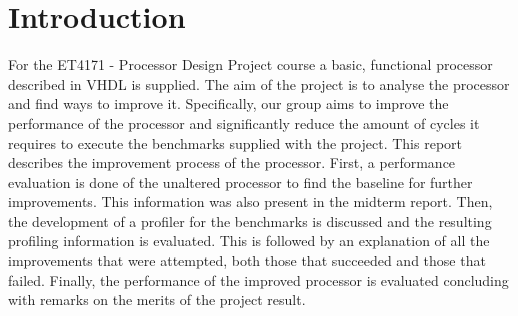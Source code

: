 \documentclass[final]{article}
\begin{document}
\section{Introduction}
For the ET4171 - Processor Design Project course a basic, functional processor described in VHDL is supplied.
The aim of the project is to analyse the processor and find ways to improve it.
Specifically, our group aims to improve the performance of the processor and significantly reduce the amount of cycles it requires to execute the benchmarks supplied with the project.
This report describes the improvement process of the processor.
First, a performance evaluation is done of the unaltered processor to find the baseline for further improvements.
This information was also present in the midterm report.
Then, the development of a profiler for the benchmarks is discussed and the resulting profiling information is evaluated.
This is followed by an explanation of all the improvements that were attempted, both those that succeeded and those that failed.
Finally, the performance of the improved processor is evaluated concluding with remarks on the merits of the project result.
\end{document}
